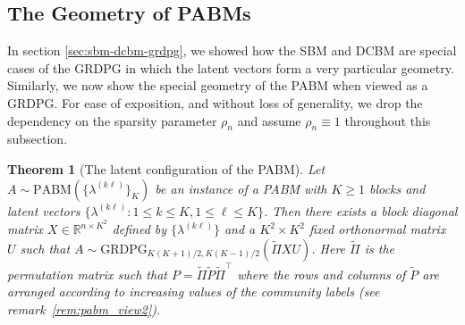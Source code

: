 \documentclass[
  11pt,
]{article}
\newtheorem{theorem}{Theorem}[section]
\theoremstyle{definition}
\theoremstyle{definition}
\theoremstyle{definition}
\theoremstyle{definition}
\theoremstyle{remark}
\begin{document}
\hypertarget{the-geometry-of-pabms}{%
\subsection{The Geometry of PABMs}\label{the-geometry-of-pabms}}

In section \ref{sec:sbm-dcbm-grdpg}, we showed how the SBM and DCBM are special cases of the GRDPG in which the latent vectors form a very particular geometry.
Similarly, we now show the special geometry of the PABM when viewed as a GRDPG.
For ease of exposition, and without loss of generality, we drop the dependency on the sparsity parameter \(\rho_n\) and assume \(\rho_n \equiv 1\) throughout this subsection.

\begin{theorem}[The latent configuration of the PABM]
\label{thm:pabm-grdpg}
Let $A \sim \mathrm{PABM}(\{\lambda^{(k \ell)}\}_K)$ be an instance of a
PABM with $K \geq 1$ blocks and latent vectors $\{\lambda^{(k \ell)}
\colon 1 \leq k \leq K, 1 \leq \ell \leq K\}$. 
Then there exists a block diagonal matrix
$X \in \mathbb{R}^{n \times K^2}$ defined by $\{\lambda^{(k \ell)}\}$ and a 
$K^2 \times K^2$ {\em fixed} orthonormal matrix $U$ such 
that $A \sim \mathrm{GRDPG}_{K (K+1) / 2, K (K-1) /
  2}(\tilde{\Pi}XU)$. Here $\tilde{\Pi}$ is the permutation matrix
such that $P = \tilde{\Pi} \tilde{P} \tilde{\Pi}^{\top}$ where the
rows and columns of $\tilde{P}$ are arranged according to increasing values of the
community labels (see remark~\ref{rem:pabm_view2}). 
\end{theorem}
\end{document}
